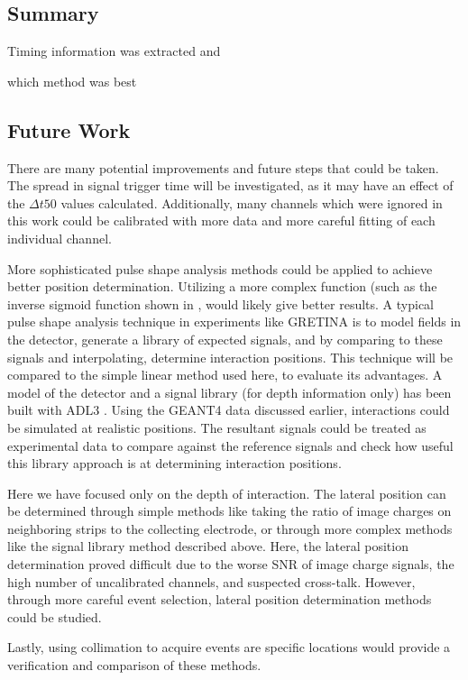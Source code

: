 \subsection*{Summary}

Timing information was extracted and 

which method was best

\subsection*{Future Work}

There are many potential improvements and future steps that could be taken. The spread in signal trigger time will be investigated, as it may have an effect of the $\Delta t50$ values calculated. Additionally, many channels which were ignored in this work could be calibrated with more data and more careful fitting of each individual channel.

More sophisticated pulse shape analysis methods could be applied to achieve better position determination. Utilizing a more complex function (such as the inverse sigmoid function shown in \cite{cci21}, would likely give better results. A typical pulse shape analysis technique in experiments like GRETINA is to model fields in the detector, generate a library of expected signals, and by comparing to these signals and interpolating, determine interaction positions. This technique will be compared to the simple linear method used here, to evaluate its advantages. A model of the detector and a signal library (for depth information only) has been built with  ADL3 \cite{adl3}. Using the GEANT4 data discussed earlier, interactions could be simulated at realistic positions. The resultant signals could be treated as experimental data to compare against the reference signals and check how useful this library approach is at determining interaction positions.

Here we have focused only on the depth of interaction. The lateral position can be determined through simple methods like taking the ratio of image charges on neighboring strips to the collecting electrode, or through more complex methods like the signal library method described above. Here, the lateral position determination proved difficult due to the worse SNR of image charge signals, the high number of uncalibrated channels, and suspected cross-talk. However, through more careful event selection, lateral position determination methods could be studied.

Lastly, using collimation to acquire events are specific locations would provide a verification and comparison of these methods.
